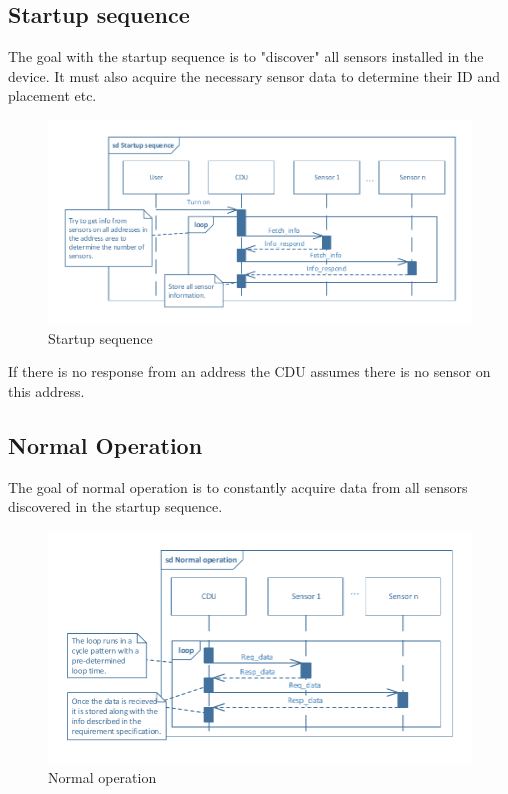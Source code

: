 \subsection{Startup sequence}
The goal with the startup sequence is to "discover" all sensors installed in the device. It must also acquire the necessary sensor data to determine their ID and placement etc.\\

\begin{figure}[hbpt]
\centering
\includegraphics[width=.9\textwidth]{billeder/Startup_Sequence_SD}
\caption{Startup sequence}
\end{figure}
If there is no response from an address the CDU assumes there is no sensor on this address.


\subsection{Normal Operation}
The goal of normal operation is to constantly acquire data from all sensors discovered in the startup sequence.

\begin{figure}[hbpt]
\centering
\includegraphics[width=.9\textwidth]{billeder/normal_operation_SD}
\caption{Normal operation}
\end{figure}


